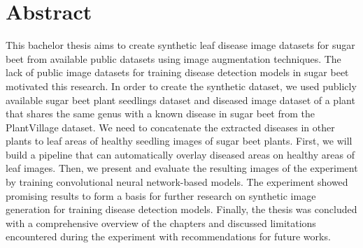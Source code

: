 

\newcommand*{\mytitle}{Generating Synthetic Images for Plant Disease in Sugar Beet using Augmentation Techniques} %
\newcommand*{\myinstitute}{Department Lippstadt 2} %


\newcommand*{\myauthor}{Olaniyi Bayonle Alao} %
\newcommand*{\myreporttype}{Bachelor Thesis} %
\newcommand*{\mygraduation}{Bachelor of Engineering} %



\newcommand*{\firstexaminer}{Prof. Dr. Stefan Henkler} %
\newcommand*{\secondexaminer}{Prof. Dr. Achim Rettberg}
\newcommand*{\thirdexaminer}{Dipl.-Wirt.-inf. Kristian Rother} %
\newcommand*{\mydate}{\today} %






\pagestyle{empty}

\newpage 					%
\thispagestyle{empty}
\quad 
\newpage
{}
 
\cleardoubleoddpage

\newpage
 \section*{Abstract}
This bachelor thesis aims to create synthetic leaf disease image datasets for sugar beet from available public datasets using image augmentation techniques. The lack of public image datasets for training disease detection models in sugar beet motivated this research. In order to create the synthetic dataset, we used publicly available sugar beet plant seedlings dataset and 
diseased image dataset of a plant that shares the same genus with a known disease in sugar beet from the PlantVillage dataset. 
We need to concatenate the extracted diseases in other plants to leaf areas of healthy seedling images of sugar beet plants. First, we will build a pipeline that can automatically overlay diseased areas on healthy areas of leaf images. Then, we present and evaluate the resulting images of the experiment by training convolutional neural network-based models. The experiment showed promising results to form a basis for further research on synthetic image generation for training disease detection models.
Finally, the thesis was concluded with a comprehensive overview of the chapters and discussed limitations encountered during the experiment with recommendations for future works.





